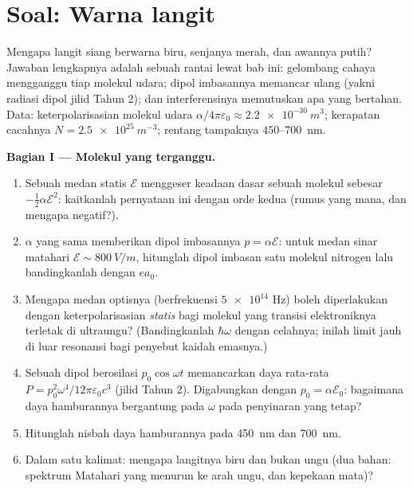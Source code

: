 \section{Soal: Warna langit}

\begin{problem}\label{pb:b3:perturbation-theory:1}
Mengapa langit siang berwarna biru, senjanya merah, dan awannya putih?
Jawaban lengkapnya adalah sebuah rantai lewat bab ini: gelombang cahaya
mengganggu tiap molekul udara; dipol imbasannya memancar ulang (yakni
radiasi dipol jilid Tahun 2); dan interferensinya memutuskan apa yang
bertahan. Data: keterpolarisasian molekul udara
$\alpha/4\pi\varepsilon_0 \approx \qty{2.2e-30}{m^3}$; kerapatan
cacahnya $N = \qty{2.5e25}{m^{-3}}$; rentang tampaknya
$450$--\qty{700}{nm}.

\medskip\noindent\textbf{Bagian I --- Molekul yang terganggu.}
\begin{enumerate}
  \item Sebuah medan statis $\mathcal E$ menggeser keadaan dasar sebuah
        molekul sebesar $-\tfrac12\alpha\mathcal E^2$: kaitkanlah
        pernyataan ini dengan  orde kedua (rumus yang
        mana, dan mengapa negatif?).
  \item $\alpha$ yang sama memberikan dipol imbasannya $p =
        \alpha\mathcal E$: untuk medan sinar matahari $\mathcal E \sim
        \qty{800}{V/m}$, hitunglah dipol imbasan satu molekul nitrogen
        lalu bandingkanlah dengan $ea_0$.
  \item Mengapa medan optisnya (berfrekuensi $\num{5e14}$ Hz) boleh
        diperlakukan dengan keterpolarisasian \emph{statis} bagi
        molekul yang transisi elektroniknya terletak di ultraungu?
        (Bandingkanlah $\hbar\omega$ dengan celahnya; inilah limit jauh
        di luar resonansi bagi penyebut kaidah emasnya.)
  \item Sebuah dipol berosilasi $p_0\cos\omega t$ memancarkan daya
        rata-rata $P = p_0^2\omega^4/12\pi\varepsilon_0c^3$
        (jilid Tahun 2). Digabungkan dengan $p_0 = \alpha\mathcal
        E_0$: bagaimana daya hamburannya bergantung pada $\omega$ pada
        penyinaran yang tetap?
  \item Hitunglah nisbah daya hamburannya pada \qty{450}{nm}
        dan \qty{700}{nm}.
  \item Dalam satu kalimat: mengapa langitnya biru dan bukan ungu
        (dua bahan: spektrum Matahari yang menurun ke arah ungu, dan
        kepekaan mata)?
\end{enumerate}


\end{problem}

